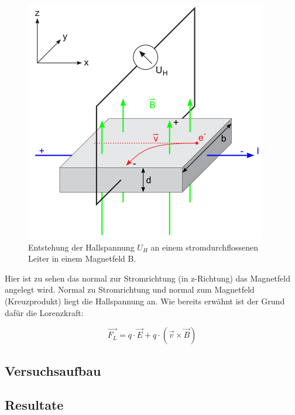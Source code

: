 \documentclass[12pt,a4paper]{article}
\begin{document}
\begin{multicols}{2}
\begin{figure}[H]
	\centering
	\includegraphics[scale=0.5]{./figures/hallspannung_aufbau.png}
	\caption{Entstehung der Hallspannung $U_H$ an einem stromdurchflossenen Leiter in einem Magnetfeld B.}
	\label{fig:hallspannung_aufbau}
\end{figure}

Hier ist zu sehen das normal zur Stromrichtung (in z-Richtung) das Magnetfeld angelegt wird. Normal zu Stromrichtung und normal zum Magnetfeld (Kreuzprodukt) liegt die Hallspannung an. Wie bereits erwähnt ist der Grund dafür die Lorenzkraft:

$$\vec{F_{L}} = q \cdot \vec{E} + q \cdot (\vec{v} \times \vec{B})$$



\subsection{Versuchsaufbau}





\end{multicols}
\subsection{Resultate}

\end{document}
